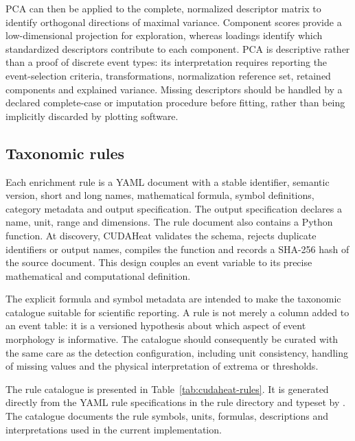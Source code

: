 PCA can then be applied to the complete, normalized descriptor matrix to identify orthogonal directions of maximal variance. Component scores provide a low-dimensional projection for exploration, whereas loadings identify which standardized descriptors contribute to each component. PCA is descriptive rather than a proof of discrete event types: its interpretation requires reporting the event-selection criteria, transformations, normalization reference set, retained components and explained variance. Missing descriptors should be handled by a declared complete-case or imputation procedure before fitting, rather than being implicitly discarded by plotting software.

\subsection{Taxonomic rules}

Each enrichment rule is a YAML document with a stable identifier, semantic version, short and long names, mathematical formula, symbol definitions, category metadata and output specification. The output specification declares a name, unit, range and dimensions. The rule document also contains a Python  function. At discovery, CUDAHeat validates the schema, rejects duplicate identifiers or output names, compiles the function and records a SHA-256 hash of the source document. This design couples an event variable to its precise mathematical and computational definition.

The explicit formula and symbol metadata are intended to make the taxonomic catalogue suitable for scientific reporting. A rule is not merely a column added to an event table: it is a versioned hypothesis about which aspect of event morphology is informative. The catalogue should consequently be curated with the same care as the detection configuration, including unit consistency, handling of missing values and the physical interpretation of extrema or thresholds.


The rule catalogue is presented in Table~\ref{tab:cudaheat-rules}. It is generated directly from the YAML rule specifications in the rule directory and typeset by . The catalogue documents the rule symbols, units, formulas, descriptions and interpretations used in the current implementation.

\clearpage
\onecolumn
{}
\pagestyle{empty}
\begin{landscape}
\small
\begingroup
{}
%

\endgroup
\end{landscape}
\clearpage
\restoregeometry
\pagestyle{plain}
\twocolumn


